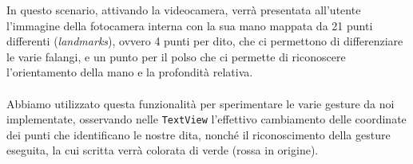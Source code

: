 \begin{multicols}{2}
\begin{multicolfigure}
    \end{multicolfigure}
\end{multicols}

\noindent In questo scenario, attivando la videocamera, verrà presentata all'utente l'immagine della fotocamera interna con la sua mano mappata da 21 punti 
differenti (\textit{landmarks}), ovvero 4 punti per dito, che ci permettono di differenziare le varie falangi, e un punto per 
il polso che ci permette di riconoscere l'orientamento della mano e la profondità relativa.\\
\\
\noindent Abbiamo utilizzato questa funzionalità per sperimentare le varie gesture da noi implementate, osservando nelle \texttt{TextView}
l'effettivo cambiamento delle coordinate dei punti che identificano le nostre dita, nonché il 
riconoscimento della gesture eseguita, la cui scritta verrà colorata di verde (rossa in origine).


\newpage
